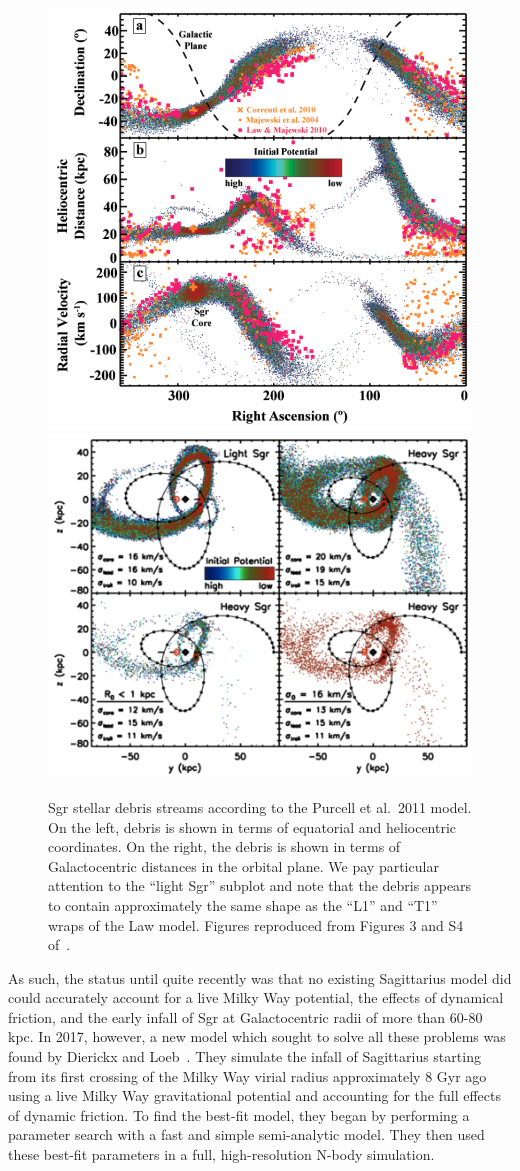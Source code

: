 \begin{figure}
    \centering 
    \includegraphics[width=0.41\linewidth]{figs/purcell2011-3.png}
    \includegraphics[width=0.5\linewidth]{figs/purcell2011-s4.png}
    \caption{%
        Sgr stellar debris streams according to the Purcell et al.~2011 model.
        On the left, debris is shown in terms of equatorial and heliocentric
        coordinates. On the right, the debris is shown in terms of
        Galactocentric distances in the orbital plane. We pay particular
        attention to the ``light Sgr'' subplot and note that the debris
        appears to contain approximately the same shape as the ``L1'' and
        ``T1'' wraps of the Law model. Figures reproduced from Figures 3 and
        S4 of~\cite{purcell_sagittarius_2011}.
    }
    \label{fig:purcell}
\end{figure}

As such, the status until quite recently was that no existing Sagittarius
model did could accurately account for a live Milky Way potential, the effects
of dynamical friction, and the early infall of Sgr at Galactocentric radii of
more than 60-80 kpc. In 2017, however, a new model which sought to solve all
these problems was found by Dierickx and Loeb~\cite{dierickx_predicted_2017}.
They simulate the infall of Sagittarius starting from its first crossing of
the Milky Way virial radius approximately 8 Gyr ago using a live Milky Way
gravitational potential and accounting for the full effects of dynamic
friction. To find the best-fit model, they began by performing a parameter
search with a fast and simple semi-analytic model. They then used these
best-fit parameters in a full, high-resolution N-body simulation.

